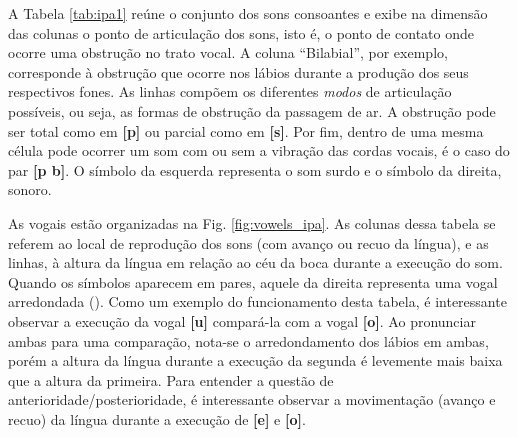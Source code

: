 A Tabela \ref{tab:ipa1} reúne o conjunto dos sons consoantes e exibe na dimensão das colunas o ponto de articulação dos sons, isto é, o ponto de contato onde ocorre uma obstrução no trato vocal. A coluna “Bilabial”, por exemplo, corresponde à obstrução que ocorre nos lábios durante a produção dos seus respectivos fones. As linhas compõem os diferentes \textit{modos} de articulação possíveis, ou seja, as formas de obstrução da passagem de ar. A obstrução pode ser total como em \textbf{[p]} ou parcial como em \textbf{[s]}. Por fim, dentro de uma mesma célula pode ocorrer um som com ou sem a vibração das cordas vocais, é o caso do par \textbf{[p b]}. O símbolo da esquerda representa o som surdo e o símbolo da direita, sonoro. 

As vogais estão organizadas na Fig. \ref{fig:vowels_ipa}. As colunas dessa tabela se referem ao local de reprodução dos sons (com avanço ou recuo da língua), e as linhas, à altura da língua em relação ao céu da boca durante a execução do som. Quando os símbolos aparecem em pares, aquele da direita representa uma vogal arredondada (\cite{paraconhecer:2015}). Como um exemplo do funcionamento desta tabela, é interessante observar a execução da vogal \textbf{[u]} compará-la com a vogal \textbf{[o]}. Ao pronunciar ambas para uma comparação, nota-se o arredondamento dos lábios em ambas, porém a altura da língua durante a execução da segunda é levemente mais baixa que a altura da primeira. Para entender a questão de anterioridade/posterioridade, é interessante observar a movimentação (avanço e recuo) da língua durante a execução de \textbf{[e]} e \textbf{[o]}.

